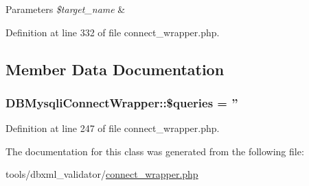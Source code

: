 \begin{DoxyParams}{Parameters}
{\em \$target\+\_\+name} & \\
\hline
\end{DoxyParams}


Definition at line 332 of file connect\+\_\+wrapper.\+php.



\subsection{Member Data Documentation}
\hypertarget{classDBMysqliConnectWrapper_afd8325db0f985a8fb938c446ac0971ee}{
\subsubsection[{\$queries}]{\setlength{\rightskip}{0pt plus 5cm}D\+B\+Mysqli\+Connect\+Wrapper\+::\$queries = ''}}\label{classDBMysqliConnectWrapper_afd8325db0f985a8fb938c446ac0971ee}


Definition at line 247 of file connect\+\_\+wrapper.\+php.



The documentation for this class was generated from the following file\+:\begin{DoxyCompactItemize}
\item 
tools/dbxml\+\_\+validator/\hyperlink{connect__wrapper_8php}{connect\+\_\+wrapper.\+php}\end{DoxyCompactItemize}
